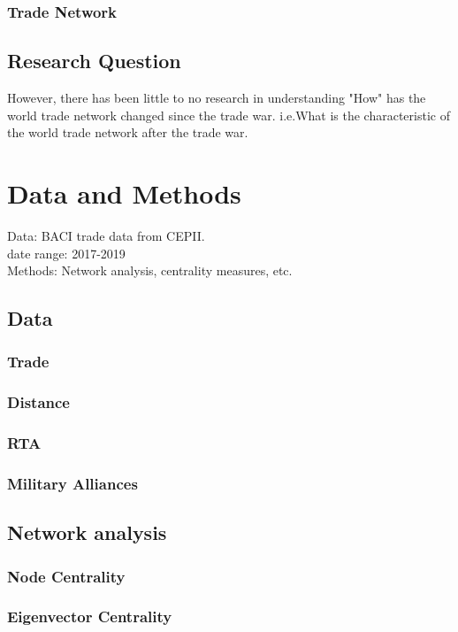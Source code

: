 \documentclass[a4paper, 12pt]{article}
\begin{document}
        \subsubsection{Trade Network}
    \subsection{Research Question}
        However, there has been little to no research in understanding "How" has the world trade network changed since the trade war. i.e.What is the characteristic of the world trade network after the trade war.
\newpage

\section{Data and Methods}
    Data: BACI trade data from CEPII.\\
    date range: 2017-2019\\
    Methods: Network analysis, centrality measures, etc.\\
    \subsection{Data}
        \subsubsection{Trade}
        \subsubsection{Distance}
        \subsubsection{RTA}
        \subsubsection{Military Alliances}

    \subsection{Network analysis}
        \subsubsection{Node Centrality}
        \subsubsection{Eigenvector Centrality}
\end{document}
